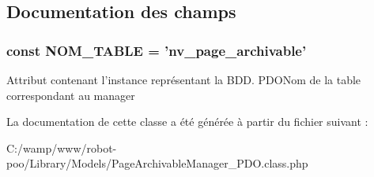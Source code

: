 \subsection{Documentation des champs}
\hypertarget{class_library_1_1_models_1_1_page_archivable_manager___p_d_o_a243755033f10b0817aa9d990cc252817}{
\subsubsection[{N\+O\+M\+\_\+\+T\+A\+B\+L\+E}]{\setlength{\rightskip}{0pt plus 5cm}const N\+O\+M\+\_\+\+T\+A\+B\+L\+E = 'nv\+\_\+page\+\_\+archivable'}}\label{class_library_1_1_models_1_1_page_archivable_manager___p_d_o_a243755033f10b0817aa9d990cc252817}
Attribut contenant l'instance représentant la B\+D\+D.  P\+D\+O\+Nom de la table correspondant au manager 

La documentation de cette classe a été générée à partir du fichier suivant \+:\begin{DoxyCompactItemize}
\item 
C\+:/wamp/www/robot-\/poo/\+Library/\+Models/Page\+Archivable\+Manager\+\_\+\+P\+D\+O.\+class.\+php\end{DoxyCompactItemize}
